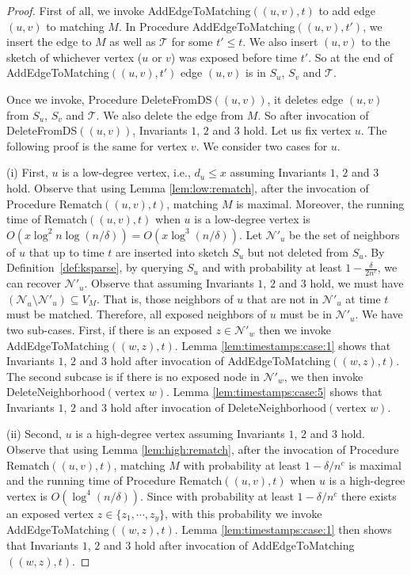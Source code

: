 \documentclass[11pt,letter]{article}
\begin{document}
\begin{proof}
First of all, we invoke {\sf AddEdgeToMatching$((u,v),t)$} to add edge $(u,v)$
to matching $M$. In Procedure {\sf AddEdgeToMatching$((u,v),t')$}, we insert the edge to
$M$ as well as $\mathcal{T}$ for some $t'\le t$.
We also insert $(u,v)$ to the sketch of
whichever vertex ($u$ or $v$) was exposed before time $t'$.
So at the end of {\sf AddEdgeToMatching$((u,v),t')$} edge $(u,v)$ is in $S_u$, $S_v$ and $\mathcal{T}$.

Once we invoke, Procedure {\sf DeleteFromDS$((u, v))$}, it deletes edge $(u,v)$ from
$S_u$, $S_v$ and $\mathcal{T}$. We also delete the edge from $M$. So after invocation of
{\sf DeleteFromDS$((u, v))$}, Invariants $1$, $2$ and $3$ hold.
Let us fix vertex $u$. The following proof is the same for vertex $v$.
We consider two cases for $u$.

(i) First, $u$ is a low-degree vertex, i.e., $d_u\le x$
assuming Invariants $1$, $2$ and $3$ hold. Observe that using
Lemma \ref{lem:low:rematch}, after the invocation of Procedure
{\sf Rematch$((u,v), t)$}, matching $M$ is maximal.
Moreover, the running time of {\sf Rematch$((u,v), t)$} when $u$ is
a low-degree vertex is $O(x\log^2 n\log(n/\delta))=O(x\log^3(n/\delta))$.
Let $\mathcal{N}'_u$ be the set of neighbors of $u$ that up to time $t$
are inserted into sketch $S_u$ but not deleted from $S_u$.
By Definition~\ref{def:ksparse},
by querying $S_u$ and with probability at least $1-\frac{\delta}{2n^c}$, we can recover $\mathcal{N}'_u$.
Observe that assuming Invariants $1$, $2$ and $3$ hold, we must have
$(\mathcal{N}_u \setminus \mathcal{N}'_u) \subseteq V_M$.
That is, those neighbors of
$u$ that are not in $\mathcal{N}'_u$ at time $t$ must be matched.
Therefore, all exposed neighbors of $u$ must be in $\mathcal{N}'_u$.
We have two sub-cases. First, if there is an exposed
$z \in\mathcal{N}'_w$ then we invoke {\sf AddEdgeToMatching$((w,z), t)$}.
Lemma \ref{lem:timestamps:case:1} shows that Invariants $1$, $2$ and $3$ hold
after invocation of {\sf AddEdgeToMatching$((w,z), t)$}.
The second subcase is if there is no exposed node in $\mathcal{N}'_w$, we then invoke
{\sf DeleteNeighborhood$(\text{vertex } w)$}.
Lemma \ref{lem:timestamps:case:5} shows that Invariants $1$, $2$ and $3$ hold
after invocation of {\sf DeleteNeighborhood$(\text{vertex } w)$}.



(ii) Second, $u$ is a high-degree vertex assuming Invariants $1$, $2$ and $3$ hold.
Observe that using Lemma \ref{lem:high:rematch}, after the invocation of Procedure
{\sf Rematch$((u,v), t)$}, matching $M$ with probability at least $1-\delta/n^c$
is maximal and the running time of Procedure {\sf Rematch$((u,v), t)$}
when $u$ is a high-degree vertex is $O(\log^4(n/\delta))$.
Since with probability at least $1-\delta/n^c$ there exists an exposed vertex
$z\in \{z_1,\cdots,z_y\}$, with this probability we invoke {\sf AddEdgeToMatching$((w,z), t)$}.
Lemma \ref{lem:timestamps:case:1} then shows that Invariants $1$, $2$ and $3$ hold
after invocation of {\sf AddEdgeToMatching$((w,z), t)$}.
\end{proof}
\end{document}
